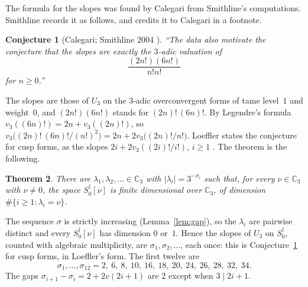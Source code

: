 \documentclass[11pt]{amsart}
\newtheorem{theorem}{Theorem}[section]
\newtheorem{conjecture}[theorem]{Conjecture}
\theoremstyle{definition}
\numberwithin{equation}{section}
\newcommand{\lean}[1]{\ignorespaces}
\newcommand{\nolean}[1]{\ignorespaces}
\newcommand{\Cp}{\mathbb{C}_3}
\newcommand{\Sd}{S_0^{\dagger}}
\newcommand{\sig}{\sigma}
\begin{document}
The formula for the slopes was found by Calegari from Smithline's computations. Smithline records it as follows, and credits it to Calegari in a footnote.

\begin{conjecture}[{Calegari; Smithline 2004 \cite[\S1, p.~288 and footnote~1]{Smi04}}]\label{conj:cal}\nolean{the conjecture; Theorem 1.2 proves it for cusp forms}
``The data also motivate the conjecture that the slopes are exactly the $3$-adic valuation of
\[
\frac{(2n!)(6n!)}{n!n!}
\]
for $n\ge0$.''
\end{conjecture}

The slopes are those of $U_3$ on the $3$-adic overconvergent forms of tame level~$1$ and weight~$0$, and $(2n!)(6n!)$ stands for $(2n)!\,(6n)!$. By Legendre's formula $v_3((6n)!)=2n+v_3((2n)!)$, so $v_3\bigl((2n)!\,(6n)!/(n!)^2\bigr)=2n+2v_3\bigl((2n)!/n!\bigr)$. Loeffler states the conjecture for cusp forms, as the slopes $2i+2v_3((2i)!/i!)$, $i\ge1$ \cite[\S3]{Loe07}. The theorem is the following.

\begin{theorem}\label{thm:main}\lean{CalegariSlopes.Final.calegari_conjecture_overconvergent, CalegariSlopes.Spectral.calegari_conjecture_overconvergent_of, CalegariSlopes.Bridge.jhyp_Sol, CalegariSlopes.Bridge.c4_Sol}
There are $\lambda_1,\lambda_2,\ldots\in\Cp$ with $|\lambda_i|=3^{-\sig_i}$ such that, for every $\nu\in\Cp$ with $\nu\ne0$, the space $\Sd[\nu]$ is finite dimensional over $\Cp$, of dimension $\#\{i\ge1:\lambda_i=\nu\}$.
\end{theorem}

The sequence $\sig$ is strictly increasing (Lemma~\ref{lem:gap}), so the $\lambda_i$ are pairwise distinct and every $\Sd[\nu]$ has dimension $0$ or~$1$. Hence the slopes of $U_3$ on $\Sd$, counted with algebraic multiplicity, are $\sig_1,\sig_2,\ldots$, each once: this is Conjecture~\ref{conj:cal} for cusp forms, in Loeffler's form. The first twelve are
\[
\sig_1,\ldots,\sig_{12}=2,\ 6,\ 8,\ 10,\ 16,\ 18,\ 20,\ 24,\ 26,\ 28,\ 32,\ 34 .
\]
The gaps $\sig_{i+1}-\sig_i=2+2v(2i+1)$ are $2$ except when $3\mid 2i+1$.
\end{document}
